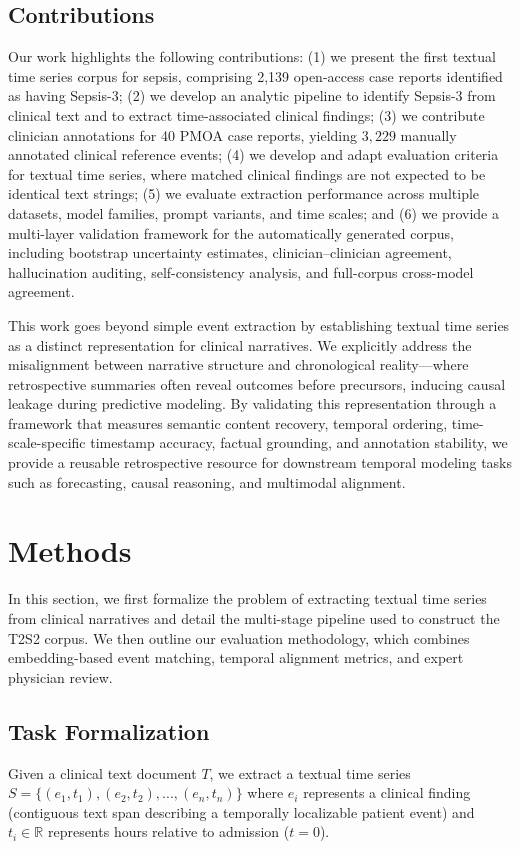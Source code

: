 \documentclass[pmlr,twocolumn,10pt]{jmlr} %
\begin{document}
\subsection{Contributions}
Our work highlights the following contributions:
(1) we present the first textual time series corpus for sepsis, comprising 2,139 open-access case reports identified as having Sepsis-3;
(2) we develop an analytic pipeline to identify Sepsis-3 from clinical text and to extract time-associated clinical findings;
(3) we contribute clinician annotations for 40 PMOA case reports, yielding $3,229$ manually annotated clinical reference events;
(4) we develop and adapt evaluation criteria for textual time series, where matched clinical findings are not expected to be identical text strings;
(5) we evaluate extraction performance across multiple datasets, model families, prompt variants, and time scales; and
(6) we provide a multi-layer validation framework for the automatically generated corpus, including bootstrap uncertainty estimates, clinician--clinician agreement, hallucination auditing, self-consistency analysis, and full-corpus cross-model agreement.

This work goes beyond simple event extraction by establishing textual time series as a distinct representation for clinical narratives.
We explicitly address the misalignment between narrative structure and chronological reality---where retrospective summaries often reveal outcomes before precursors, inducing causal leakage during predictive modeling.
By validating this representation through a framework that measures semantic content recovery, temporal ordering, time-scale-specific timestamp accuracy, factual grounding, and annotation stability, we provide a reusable retrospective resource for downstream temporal modeling tasks such as forecasting, causal reasoning, and multimodal alignment.

\section{Methods}
In this section, we first formalize the problem of extracting textual time series from clinical narratives and detail the multi-stage pipeline used to construct the T2S2 corpus. We then outline our evaluation methodology, which combines embedding-based event matching, temporal alignment metrics, and expert physician review.

\vspace{-1em}
\subsection{Task Formalization}
Given a clinical text document $T$, we extract a textual time series $S = \{(e_1,t_1), (e_2,t_2),...,(e_n,t_n)\}$ where $e_i$ represents a clinical finding (contiguous text span describing a temporally localizable patient event) and $t_i \in \mathbb{R}$ represents hours relative to admission ($t=0$).
\end{document}
